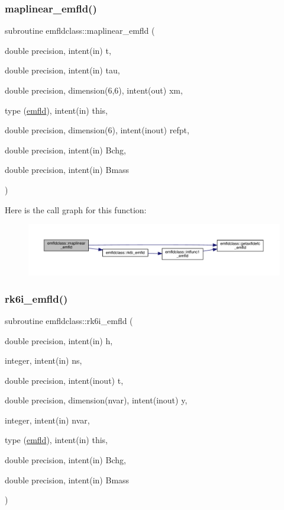 \subsubsection{\texorpdfstring{maplinear\_emfld()}{maplinear\_emfld()}}
{\footnotesize\ttfamily subroutine emfldclass\+::maplinear\+\_\+emfld (\begin{DoxyParamCaption}\item[{double precision, intent(in)}]{t,  }\item[{double precision, intent(in)}]{tau,  }\item[{double precision, dimension(6,6), intent(out)}]{xm,  }\item[{type (\mbox{\hyperlink{namespaceemfldclass_structemfldclass_1_1emfld}{emfld}}), intent(in)}]{this,  }\item[{double precision, dimension(6), intent(inout)}]{refpt,  }\item[{double precision, intent(in)}]{Bchg,  }\item[{double precision, intent(in)}]{Bmass }\end{DoxyParamCaption})}

Here is the call graph for this function\+:\nopagebreak
\begin{figure}[H]
\begin{center}
\leavevmode
\includegraphics[width=350pt]{namespaceemfldclass_ab283b339abd3df592d8200c244652131_cgraph}
\end{center}
\end{figure}
\mbox{\label{namespaceemfldclass_ae4bfa1325df7cec4a3facbe8ebc66845}} 
\subsubsection{\texorpdfstring{rk6i\_emfld()}{rk6i\_emfld()}}
{\footnotesize\ttfamily subroutine emfldclass\+::rk6i\+\_\+emfld (\begin{DoxyParamCaption}\item[{double precision, intent(in)}]{h,  }\item[{integer, intent(in)}]{ns,  }\item[{double precision, intent(inout)}]{t,  }\item[{double precision, dimension(nvar), intent(inout)}]{y,  }\item[{integer, intent(in)}]{nvar,  }\item[{type (\mbox{\hyperlink{namespaceemfldclass_structemfldclass_1_1emfld}{emfld}}), intent(in)}]{this,  }\item[{double precision, intent(in)}]{Bchg,  }\item[{double precision, intent(in)}]{Bmass }\end{DoxyParamCaption})}

